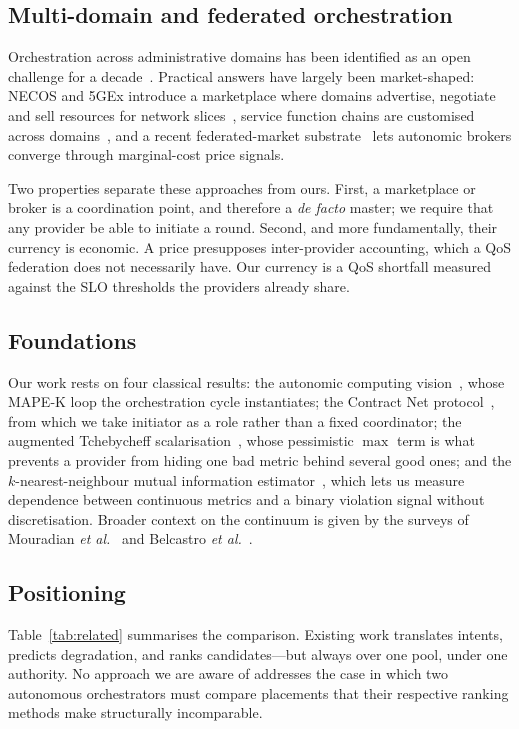 \documentclass[conference]{IEEEtran}
\begin{document}
\subsection{Multi-domain and federated orchestration}

Orchestration across administrative domains has been identified as an open
challenge for a decade~\cite{nextgen2018}. Practical answers have largely been
market-shaped: NECOS and 5GEx introduce a marketplace where domains
advertise, negotiate and sell resources for network slices~\cite{nextgen2018},
service function chains are customised across
domains~\cite{sfcmultidomain2023}, and a recent federated-market
substrate~\cite{federatedmarket2026} lets autonomic brokers converge through
marginal-cost price signals.

Two properties separate these approaches from ours. First, a marketplace or
broker is a coordination point, and therefore a \emph{de facto} master; we
require that any provider be able to initiate a round. Second, and more
fundamentally, their currency is economic. A price presupposes inter-provider
accounting, which a QoS federation does not necessarily have. Our currency is
a QoS shortfall measured against the SLO thresholds the providers already
share.

\subsection{Foundations}

Our work rests on four classical results: the autonomic computing
vision~\cite{kephart2003}, whose MAPE-K loop the orchestration cycle
instantiates; the Contract Net protocol~\cite{smith1980}, from which we take
initiator as a role rather than a fixed coordinator; the augmented
Tchebycheff scalarisation~\cite{steuer1983}, whose pessimistic $\max$ term is
what prevents a provider from hiding one bad metric behind several good ones;
and the $k$-nearest-neighbour mutual information
estimator~\cite{kraskov2004}, which lets us measure dependence between
continuous metrics and a binary violation signal without discretisation.
Broader context on the continuum is given by the surveys of Mouradian
\emph{et al.}~\cite{mouradian2018} and Belcastro
\emph{et al.}~\cite{belcastro2025}.

\subsection{Positioning}

Table~\ref{tab:related} summarises the comparison. Existing work translates
intents, predicts degradation, and ranks candidates---but always over one
pool, under one authority. No approach we are aware of addresses the case in
which two autonomous orchestrators must compare placements that their
respective ranking methods make structurally incomparable.
\end{document}
